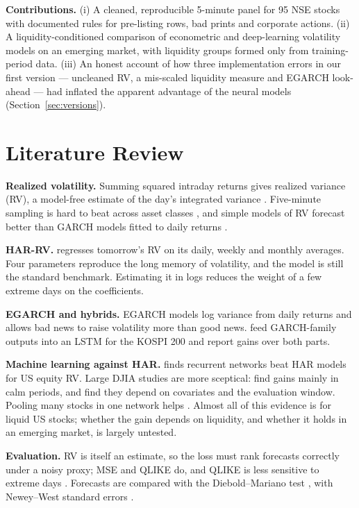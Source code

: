 \documentclass[11pt,a4paper]{article}
\let\oldsection\section
\renewcommand{\section}{\FloatBarrier\needspace{6\baselineskip}\oldsection}
\begin{document}
\textbf{Contributions.} (i) A cleaned, reproducible 5-minute panel for 95 NSE stocks with documented
rules for pre-listing rows, bad prints and corporate actions. (ii) A liquidity-conditioned comparison
of econometric and deep-learning volatility models on an emerging market, with liquidity groups formed
only from training-period data. (iii) An honest account of how three implementation errors in our
first version --- uncleaned RV, a mis-scaled liquidity measure and EGARCH look-ahead --- had inflated
the apparent advantage of the neural models (Section~\ref{sec:versions}).

\section{Literature Review}

\textbf{Realized volatility.} Summing squared intraday returns gives realized variance (RV), a
model-free estimate of the day's integrated variance \citep{andersen2003}. Five-minute sampling is
hard to beat across asset classes \citep{liu2015}, and simple models of RV forecast better than
GARCH models fitted to daily returns \citep{andersen2003}.

\textbf{HAR-RV.} \citet{corsi2009} regresses tomorrow's RV on its daily, weekly and monthly
averages. Four parameters reproduce the long memory of volatility, and the model is still the
standard benchmark. Estimating it in logs reduces the weight of a few extreme days on the
coefficients.

\textbf{EGARCH and hybrids.} EGARCH \citep{nelson1991} models log variance from daily returns and
allows bad news to raise volatility more than good news. \citet{kim2018} feed GARCH-family outputs
into an LSTM \citep{hochreiter1997} for the KOSPI 200 and report gains over both parts.

\textbf{Machine learning against HAR.} \citet{bucci2020} finds recurrent networks beat HAR models
for US equity RV. Large DJIA studies are more sceptical: \citet{rahimikia2020} find gains mainly in
calm periods, and \citet{christensen2023} find they depend on covariates and the evaluation window.
Pooling many stocks in one network helps \citep{zhang2024}. Almost all of this evidence is for
liquid US stocks; whether the gain depends on liquidity, and whether it holds in an emerging market,
is largely untested.

\textbf{Evaluation.} RV is itself an estimate, so the loss must rank forecasts correctly under a noisy
proxy; MSE and QLIKE do, and QLIKE is less sensitive to extreme days \citep{patton2011}. Forecasts are
compared with the Diebold--Mariano test \citep{diebold1995}, with Newey--West standard errors
\citep{neweywest1987}.
\end{document}
